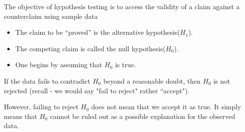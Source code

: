 \documentclass[12pt, a4paper]{article}
\begin{document}
The objective of hypothesis testing is to access the validity of a claim against a counterclaim using sample data

\begin{itemize}\item The claim to be “proved” is the alternative hypothesis($H_1$).\item The competing claim is called the null hypothesis($H_0$).\item One begins by assuming that $H_0$ is true. \end{itemize}

\vspace{0.5cm}

\noindent 
If the data fails to contradict $H_0$ beyond a reasonable doubt, then $H_0$ is not rejected (recall - we would say "fail to reject" rather ``accept"). 

However, failing to reject $H_0$ does not mean that we accept it as true. It simply means that $H_0$ cannot be ruled out as a possible explanation for the observed data.


\newpage

\end{document}
